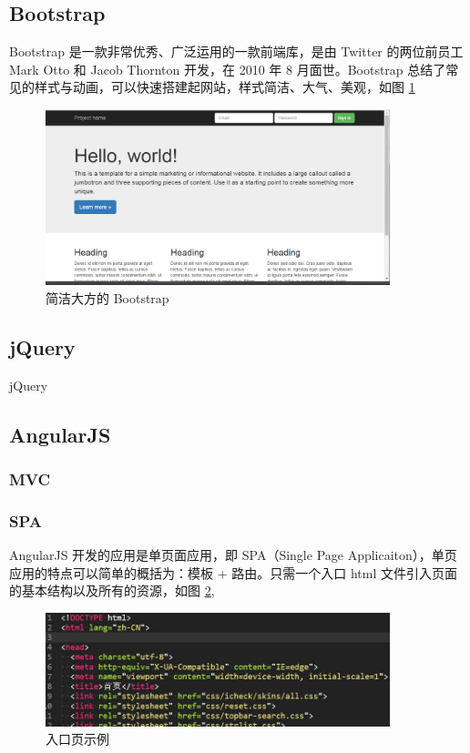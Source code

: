 \documentclass[UTF8]{ctexbook}
\begin{document}
{{        \subsection{Bootstrap}
          \label{subsec:Bootstrap}
            Bootstrap 是一款非常优秀、广泛运用的一款前端库，是由 Twitter 的两位前员工 Mark Otto 和 Jacob Thornton 开发，在 2010 年 8 月面世。Bootstrap 总结了常见的样式与动画，可以快速搭建起网站，样式简洁、大气、美观，如图 \ref{fig:bootstrap}
            \begin{figure}[H]
              \centering
              \includegraphics[width=10cm]{./img/bootstrap.png}
              \caption{简洁大方的 Bootstrap}
              \label{fig:bootstrap}
            \end{figure}

        \subsection{jQuery}
          \label{subsec:jquery}
            jQuery


        \subsection{AngularJS}
          \label{subsec:angularjs}
            \subsubsection{MVC}
              \label{subsubsec:mvc}

            \subsubsection{SPA}
              \label{subsubsec:spa}
                AngularJS 开发的应用是单页面应用，即 SPA（Single Page Applicaiton），单页应用的特点可以简单的概括为：模板 + 路由。只需一个入口 html 文件引入页面的基本结构以及所有的资源，如图 \ref{fig:index},
                \begin{figure}[H]
                  \centering
                  \includegraphics[width=10cm]{./img/index.jpg}
                  \caption{入口页示例}
                  \label{fig:index}
                \end{figure}

}}
\end{document}
